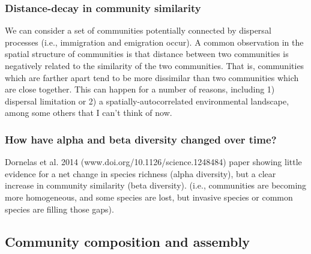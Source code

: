 \documentclass[12pt]{article}
\begin{document}
\subsubsection*{Distance-decay in community similarity}

We can consider a set of communities potentially connected by dispersal processes (i.e., immigration and emigration occur). A common observation in the spatial structure of communities is that distance between two communities is negatively related to the similarity of the two communities. That is, communities which are farther apart tend to be more dissimilar than two communities which are close together. This can happen for a number of reasons, including 1) dispersal limitation or  2) a spatially-autocorrelated environmental landscape, among some others that I can't think of now.











\subsubsection*{How have alpha and beta diversity changed over time?}

Dornelas et al. 2014 (www.doi.org/10.1126/science.1248484) paper showing little evidence for a net change in species richness (alpha diversity), but a clear increase in community similarity (beta diversity).  (i.e., communities are becoming more homogeneous, and some species are lost, but invasive species or common species are filling those gaps). 




















\clearpage












\subsection*{Community composition and assembly}
\end{document}
